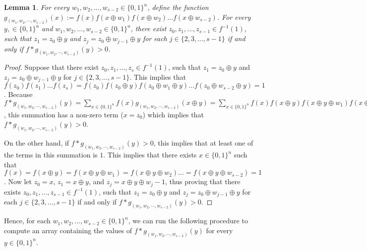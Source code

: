 \documentclass[11pt, letterpaper]{article}
\newtheorem{lemma}[theorem]{Lemma}
\theoremstyle{definition}
\newcommand{\Q}[1]{\{0,1\}^{#1}}
\begin{document}
\begin{lemma} \label{lem:convolutiondiversity}
    For every $w_1, w_2, \dots, w_{s-2} \in \Q{n}$, define the function $g_{(w_1, w_2, \cdots, w_{s-2})}(x):=f(x) f(x \oplus w_1) f(x \oplus w_2) \dots f(x \oplus w_{s-2})$. For every $y, \in \Q{n}$ and $w_1, w_2, \dots, w_{s-2} \in \Q{n}$, there exist $z_0, z_1, \dots, z_{s-1} \in f^{-1}(1)$, such that $z_1=z_0 \oplus y$ and $z_j=z_0 \oplus w_{j-1} \oplus y$ for each $j \in \{2,3, \dots, s-1\}$ if and only if $f*g_{(w_1, w_2, \cdots, w_{s-2})}(y) >0$.
\end{lemma}
\begin{proof}
    Suppose that there exist $z_0, z_1, \dots, z_s \in f^{-1}(1)$, such that $z_1=z_0 \oplus y$ and $z_j=z_0 \oplus w_{j-1} \oplus y$ for $j \in \{2,3, \dots, s-1\}$. This implies that $f(z_0) f(z_1) \dots f(z_s)=f(z_0) f(z_0 \oplus y) f(z_0 \oplus w_1 \oplus y) \dots f(z_0 \oplus w_{s-2} \oplus y)=1$. Because $f*g_{(w_1, w_2, \cdots, w_{s-2})}(y)= \sum_{x \in \Q{n}} f(x) g_{(w_1, w_2, \cdots, w_{s-2})}(x \oplus y)=\sum_{x \in \Q{n}} f(x) f(x \oplus y) f(x \oplus y \oplus w_1) f(x \oplus y \oplus w_2) \dots f(x \oplus y \oplus w_{s-2})$, this summation has a non-zero term ($x=z_0$) which implies that $f*g_{(w_1, w_2, \cdots, w_{s-2})}(y) >0$. 
    
    On the other hand, if $f*g_{(w_1, w_2, \cdots, w_{s-2})}(y) >0$, this implies that at least one of the terms in this summation is $1$. This implies that there exists $x \in \Q{n}$ such that $f(x) = f(x \oplus y) = f(x \oplus y \oplus w_1) = f(x \oplus y \oplus w_2) \dots =f(x \oplus y \oplus w_{s-2})=1$. Now let $z_0=x$, $z_1=x \oplus y$, and $z_j=x \oplus y \oplus w_j-1$, thus proving that there exists $z_0, z_1, \dots, z_{s-1} \in f^{-1}(1)$, such that $z_1=z_0 \oplus y$ and $z_j=z_0 \oplus w_{j-1} \oplus y$ for each $j \in \{2,3, \dots, s-1\}$ if and only if $f*g_{(w_1, w_2, \cdots, w_{s-2})}(y) >0$.
\end{proof}

\medskip
Hence, for each $w_1, w_2, \dots, w_{s-2} \in \Q{n}$, we can run the following procedure to compute an array containing the values of $f*g_{(w_1, w_2, \cdots, w_{s-2})}(y)$ for every $y \in \Q{n}$. 
\end{document}
